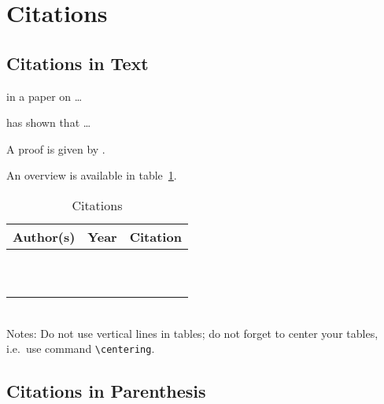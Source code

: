\documentclass[endfloat]{ecca}
\begin{document}
\section{Citations}
\subsection{Citations in Text}

\citeauthor{brown00} in a paper on \ldots

\citet[p.~12]{brown00} has shown that \ldots

A proof is given by \citet{jones98}.

An overview is available in table~\ref{tab:citations}.

\begin{table}[htbp]
\centering
\caption{Citations}
\label{tab:citations}
\begin{tabular}{lll}
\hline
Author(s) & Year & Citation\\
\hline
\citeauthor{brown00} & \citeyear{brown00} & \citet{brown00}\\
\citeauthor{jones99} & \citeyear{jones99} & \citet{jones99}\\
\citeauthor{jones99a} & \citeyear{jones99a} & \citet{jones99a}\\
\citeauthor{brown00a} & \citeyear{brown00a} & \citet{brown00a}\\
\citeauthor{jones98} & \citeyear{jones98} & \citet{jones98}\\
\citeauthor{allen95} & \citeyear{allen95} & \citet{allen95}\\
\citeauthor{atkinson92} & \citeyear{atkinson92} & \citet{atkinson92}\\
\citeauthor{bernanke88} & \citeyear{bernanke88} & \citet{bernanke88}\\
\citeauthor{bernanke95} & \citeyear{bernanke95} & \citet{bernanke95}\\
\citeauthor{bernanke96} & \citeyear{bernanke96} & \citet{bernanke96}\\
\hline
\end{tabular}
\medskip \\
Notes: Do not use vertical lines in tables;
do not forget to center your tables,
i.e.\ use command \texttt{\textbackslash{}centering}.
\end{table}


\subsection{Citations in Parenthesis}
\end{document}
